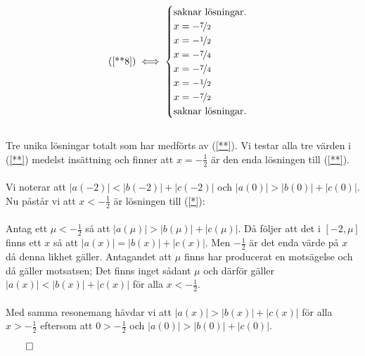 \documentclass{article}
\begin{document}
\begin{gather*}
  \text{(\ref{**8})} \iff
  \begin{cases}
    \text{saknar lösningar.} \\
    x = - \nicefrac{7}{2} \\
    x = - \nicefrac{1}{2} \\
    x = - \nicefrac{7}{4} \\
    x = - \nicefrac{7}{4} \\
    x = - \nicefrac{1}{2} \\
    x = - \nicefrac{7}{2} \\
    \text{saknar lösningar.} \\
  \end{cases}
\end{gather*}
\\
Tre unika lösningar totalt som har medförts av (\ref{**}). Vi testar alla tre värden i (\ref{**}) medelst insättning och finner att $x = -\tfrac{1}{2}$ är den enda lösningen till (\ref{**}).
\\
\\
Vi noterar att $|a(-2)| < |b(-2)| + |c(-2)|$ och $|a(0)| > |b(0)| + |c(0)|$. Nu påstår vi att $x < -\tfrac{1}{2}$ är lösningen till (\ref{*}):
\\
\\
Antag ett $\mu < -\tfrac{1}{2}$ så att $|a(\mu)| > |b(\mu)| + |c(\mu)|$. Då följer att det i $[-2, \mu]$ finns ett $x$ så att $|a(x)| = |b(x)| + |c(x)|$. Men $-\tfrac{1}{2}$ är det enda värde på $x$ då denna likhet gäller. Antagandet att $\mu$ finns har producerat en motsägelse och då gäller motsatsen; Det finns inget sådant $\mu$ och därför gäller $|a(x)| < |b(x)| + |c(x)|$ för alla $x < -\tfrac{1}{2}$.
\\
\\
Med samma resonemang hävdar vi att $|a(x)| > |b(x)| + |c(x)|$ för alla $x > -\tfrac{1}{2}$ eftersom att $0 > -\tfrac{1}{2}$ och $|a(0)| > |b(0)| + |c(0)|$.

\centerline{$\qed$}
\end{document}
